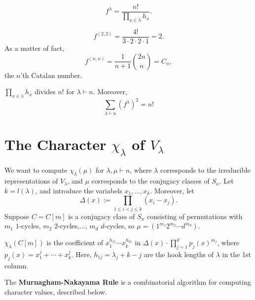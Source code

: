 \begin{thm}
    $$f^\lambda = \frac{n!}{\prod_{x \in \lambda}h_x}.$$
\end{thm}
\begin{ex}
    $$f^{(2,2)}=\frac{4!}{3\cdot 2 \cdot 2 \cdot 1}=2.$$
    As a matter of fact,
    $$f^{(n,n)}=\frac{1}{n+1}\binom{2n}{n}=C_n,$$
    the $n$'th Catalan number.
\end{ex}
\begin{cor}
    $\prod_{x \in \lambda}h_x$ divides $n!$ for $\lambda \vdash n$. Moreover,
    $$\sum_{\lambda \vdash n}(f^\lambda)^2 = n!$$
\end{cor}

\section{\texorpdfstring{The Character $\chi_\lambda$ of $V_\lambda$}{The Character chi-lambda of V-lambda}}

 We want to compute $\chi_\lambda(\mu)$ for $\lambda,\mu \vdash n$, where $\lambda$ corresponds to the irreducible representations of $V_\lambda$, and $\mu$ corresponds to the conjugacy classes of $S_n$. Let $k=l(\lambda)$, and introduce the variabels $x_1,\dots,x_k$. Moreover, let
 $$\Delta(x):= \prod_{1 \leq i < j \leq k}(x_i-x_j).$$
 Suppose $C=C[m]$ is a conjugacy class of $S_n$ consisting of permutations with $m_1$ $1$-cycles, $m_2$ $2$-cycles,$\dots$, $m_d$ $d$-cycles, so $\mu = (1^{m_1}2^{m_2}\cdots d^{m_d})$.

\begin{prop}
    $\chi_\lambda (C[m])$ is the coefficient of $x_1^{h_{11}}\cdots x_k^{h_{k1}}$ in $\Delta(x) \cdot \prod _{j=1}^dp_j(x)^{m_j}$, where $p_j(x) = x_1^j+\cdots + x_k^j$. Here, $h_{1 j}=\lambda_j+k-j$ are the hook lengths of $\lambda$ in the 1st column.
\end{prop}

\begin{defn}
    The \textbf{Murnagham-Nakayama Rule} is a combinatorial algorithm for computing character values, described below.
\end{defn}

